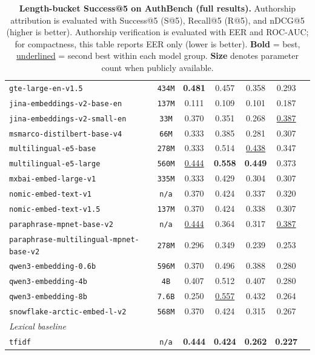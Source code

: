 \documentclass{article}
\newcommand{\rev}[1]{#1}
\begin{document}
\begin{table}[htbp]
{\begin{tabular}{lcccccc}
\texttt{gte-large-en-v1.5} & \texttt{434M} & \textbf{0.481} & 0.457 & 0.358 & 0.293 \\
\texttt{jina-embeddings-v2-base-en} & \texttt{137M} & 0.111 & 0.109 & 0.101 & 0.187 \\
\texttt{jina-embeddings-v2-small-en} & \texttt{33M} & 0.370 & 0.351 & 0.268 & \underline{0.387} \\
\texttt{msmarco-distilbert-base-v4} & \texttt{66M} & 0.333 & 0.385 & 0.281 & 0.307 \\
\texttt{multilingual-e5-base} & \texttt{278M} & 0.333 & 0.514 & \underline{0.438} & 0.347 \\
\texttt{multilingual-e5-large} & \texttt{560M} & \underline{0.444} & \textbf{0.558} & \textbf{0.449} & 0.373 \\
\texttt{mxbai-embed-large-v1} & \texttt{335M} & 0.333 & 0.429 & 0.304 & 0.307 \\
\texttt{nomic-embed-text-v1} & \texttt{n/a} & 0.370 & 0.424 & 0.337 & 0.320 \\
\texttt{nomic-embed-text-v1.5} & \texttt{137M} & 0.370 & 0.424 & 0.338 & 0.307 \\
\texttt{paraphrase-mpnet-base-v2} & \texttt{n/a} & \underline{0.444} & 0.364 & 0.317 & \underline{0.387} \\
\texttt{paraphrase-multilingual-mpnet-base-v2} & \texttt{278M} & 0.296 & 0.349 & 0.239 & 0.253 \\
\texttt{qwen3-embedding-0.6b} & \texttt{596M} & 0.370 & 0.496 & 0.388 & 0.280 \\
\texttt{qwen3-embedding-4b} & \texttt{4B} & 0.407 & 0.512 & 0.407 & 0.280 \\
\texttt{qwen3-embedding-8b} & \texttt{7.6B} & 0.250 & \underline{0.557} & 0.432 & 0.264 \\
\texttt{snowflake-arctic-embed-l-v2} & \texttt{568M} & 0.370 & 0.424 & 0.315 & 0.267 \\
\midrule
\multicolumn{6}{l}{\textit{Lexical baseline}} \\
\midrule
\texttt{tfidf} & \texttt{n/a} & \textbf{0.444} & \textbf{0.424} & \textbf{0.262} & \textbf{0.227} \\
\bottomrule
\end{tabular}
}
\caption{\textbf{Length-bucket Success@5 on AuthBench (full results).} Authorship attribution is evaluated with Success@5 (S@5), Recall@5 (R@5), and nDCG@5 (higher is better). \rev{Authorship verification is evaluated with EER and ROC-AUC; for compactness, this table reports EER only (lower is better).} \textbf{Bold} = best, \underline{underlined} = second best within each model group. \textbf{Size} denotes parameter count when publicly available.}
\label{tab:length-s5-full}
\end{table}
\end{document}
